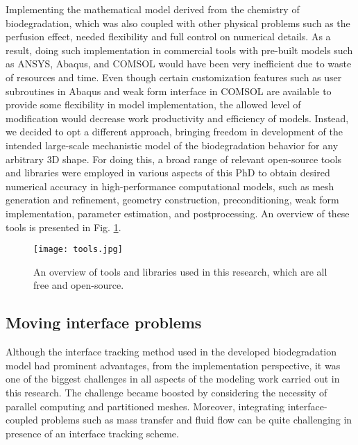Implementing the mathematical model derived from the chemistry of biodegradation, which was also coupled with other physical problems such as the perfusion effect, needed flexibility and full control on numerical details. As a result, doing such implementation in commercial tools with pre-built models such as ANSYS, Abaqus, and COMSOL would have been very inefficient due to waste of resources and time. Even though certain customization features such as user subroutines in Abaqus and weak form interface in COMSOL are available to provide some flexibility in model implementation, the allowed level of modification would decrease work productivity and efficiency of models. Instead, we decided to opt a different approach, bringing freedom in development of the intended large-scale mechanistic model of the biodegradation behavior for any arbitrary 3D shape. For doing this, a broad range of relevant open-source tools and libraries were employed in various aspects of this PhD to obtain desired numerical accuracy in high-performance computational models, such as mesh generation and refinement, geometry construction, preconditioning, weak form implementation, parameter estimation, and postprocessing. An overview of these tools is presented in Fig. \ref{fig:conclusion_tools}.

\begin{figure}[h]
\centering
\medskip
\texttt{[image: tools.jpg]}
\caption[Overview of open-source tools and libraries used in this PhD]{An overview of tools and libraries used in this research, which are all free and open-source.} \label{fig:conclusion_tools}
\end{figure}






\subsection{Moving interface problems}

Although the interface tracking method used in the developed biodegradation model had prominent advantages, from the implementation perspective, it was one of the biggest challenges in all aspects of the modeling work carried out in this research. The challenge became boosted by considering the necessity of parallel computing and partitioned meshes. Moreover, integrating interface-coupled problems such as mass transfer and fluid flow can be quite challenging in presence of an interface tracking scheme. 


